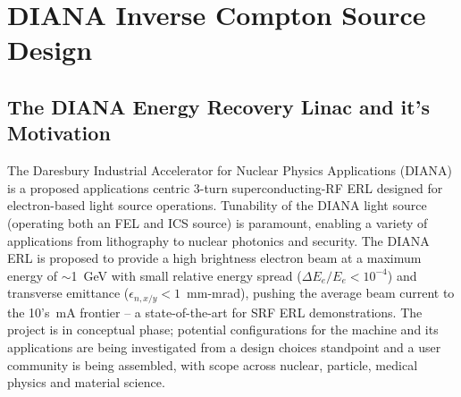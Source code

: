\documentclass[../main.tex]{subfiles}
\begin{document}
\chapter{DIANA Inverse Compton Source Design}
\label{DIANA_Inverse_Compton_Source_Design} %

\section{The DIANA Energy Recovery Linac and it's Motivation}

The Daresbury Industrial Accelerator for Nuclear Physics Applications (DIANA) is a proposed applications centric 3-turn superconducting-RF ERL designed for electron-based light source operations. Tunability of the DIANA light source (operating both an FEL and ICS source) is paramount, enabling a variety of applications from lithography to nuclear photonics and security. The DIANA ERL is proposed to provide a high brightness electron beam at a maximum energy of $\sim$1~\si{\giga\electronvolt} with small relative energy spread ($\Delta E_{e}/E_{e} < 10^{-4}$) and transverse emittance ($\epsilon_{n,x/y}< 1$~\si{\milli\meter}-\si{\milli\radian}), pushing the average beam current to the 10's~\si{\milli\ampere} frontier -- a state-of-the-art for SRF ERL demonstrations. The project is in conceptual phase; potential configurations for the machine and its applications are being investigated from a design choices standpoint and a user community is being assembled, with scope across nuclear, particle, medical physics and material science.  
\end{document}
